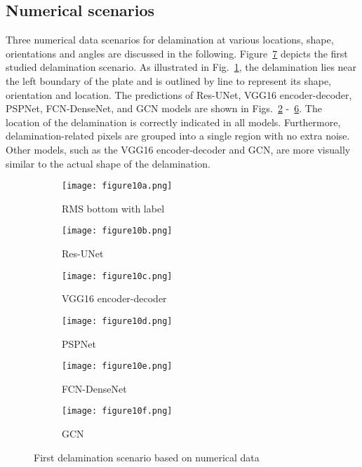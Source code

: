 \subsection{Numerical scenarios}
Three numerical data scenarios for delamination at various locations, shape, orientations and angles are discussed in the following.
Figure~\ref{fig:softmax_448} depicts the first studied delamination scenario.
As illustrated in Fig.~\ref{fig:RMS_flat_shell_Vz_448}, the delamination lies near the left boundary of the plate and is outlined by line to represent its shape, orientation and location.
The predictions of Res-UNet, VGG16 encoder-decoder, PSPNet, FCN-DenseNet, and GCN models are shown in Figs.~\ref{fig:unet_pred_448} -~\ref{fig:gcn_pred_448}.
The location of the delamination is correctly indicated in all models.
Furthermore, delamination-related pixels are grouped into a single region with no extra noise.
Other models, such as the VGG16 encoder-decoder and GCN, are more visually similar to the actual shape of the delamination.
\begin{figure}[!h]
	\centering
	\begin{subfigure}[b]{0.47\textwidth}
		\centering
		\texttt{[image: figure10a.png]}
		\caption{RMS bottom with label}
		\label{fig:RMS_flat_shell_Vz_448}
	\end{subfigure}
	\hfill
	\begin{subfigure}[b]{0.47\textwidth}
		\centering
		\texttt{[image: figure10b.png]}
		\caption{Res-UNet}
		\label{fig:unet_pred_448}
	\end{subfigure}
	\hfill
	\begin{subfigure}[b]{0.47\textwidth}
		\centering
		\texttt{[image: figure10c.png]}
		\caption{VGG16 encoder-decoder}
		\label{fig:vgg16_pred_448}
	\end{subfigure}
	\hfill
	\begin{subfigure}[b]{0.47\textwidth}
		\centering
		\texttt{[image: figure10d.png]}
		\caption{PSPNet}
		\label{fig:pspnet_pred_448}
	\end{subfigure}
	\hfill
	\begin{subfigure}[b]{0.47\textwidth}
		\centering
		\texttt{[image: figure10e.png]}
		\caption{FCN-DenseNet}
		\label{fig:fcn_densenet_pred_448}
	\end{subfigure}
	\hfill
	\begin{subfigure}[b]{0.47\textwidth}
		\centering
		\texttt{[image: figure10f.png]}
		\caption{GCN}
		\label{fig:gcn_pred_448}
	\end{subfigure}
	\caption{First delamination scenario based on numerical data}
	\label{fig:softmax_448}
\end{figure} 
\clearpage

